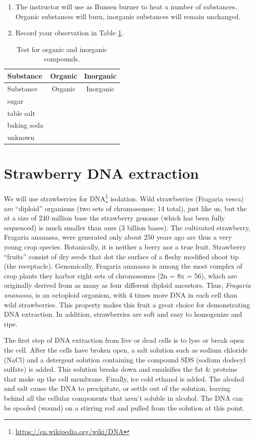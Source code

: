 \documentclass[]{book}
\providecommand{\tightlist}{%
  \setlength{\itemsep}{0pt}\setlength{\parskip}{0pt}}
\let\rmarkdownfootnote\footnote%
\def\footnote{\protect\rmarkdownfootnote}
\renewcommand{\href}[2]{#2\footnote{\url{#1}}}
\theoremstyle{definition}
\theoremstyle{definition}
\theoremstyle{definition}
\theoremstyle{remark}
\begin{document}
\begin{enumerate}
\def\labelenumi{\arabic{enumi}.}
\tightlist
\item
  The instructor will use as Bunsen burner to heat a number of
  substances. Organic substances will burn, inorganic substances will
  remain unchanged.
\item
  Record your observation in Table \ref{tab:organic}.
\end{enumerate}

\begin{longtable}[]{@{}lcc@{}}
\caption{\label{tab:organic} Test for organic and inorganic
compounds.}\tabularnewline
\toprule
Substance & Organic & Inorganic\tabularnewline
\midrule
\endfirsthead
\toprule
Substance & Organic & Inorganic\tabularnewline
\midrule
\endhead
sugar & &\tabularnewline
table salt & &\tabularnewline
baking soda & &\tabularnewline
unknown & &\tabularnewline
\bottomrule
\end{longtable}

\section{Strawberry DNA extraction}\label{strawberry-dna-extraction}

We will use strawberries for
\href{https://en.wikipedia.org/wiki/DNA}{DNA} isolation. Wild
strawberries (Fragaria vesca) are ``diploid'' organisms (two sets of
chromosomes; 14 total), just like us, but the at a size of 240 million
base the strawberry genome (which has been fully sequenced) is much
smaller than ours (3 billion bases). The cultivated strawberry, Fragaria
ananassa, were generated only about 250 years ago are thus a very young
crop species. Botanically, it is neither a berry nor a true fruit.
Strawberry ``fruits'' consist of dry seeds that dot the surface of a
fleshy modified shoot tip (the receptacle). Genomically, Fragaria
ananassa is among the most complex of crop plants they harbor eight sets
of chromosomes (2n = 8x = 56), which are originally derived from as many
as four different diploid ancestors. Thus, \emph{Fragaria ananassa}, is
an octoploid organism, with 4 times more DNA in each cell than wild
strawberries. This property makes this fruit a great choice for
demonstrating DNA extraction. In addition, strawberries are soft and
easy to homogenize and ripe.

The first step of DNA extraction from live or dead cells is to lyse or
break open the cell. After the cells have broken open, a salt solution
such as sodium chloride (NaCl) and a detergent solution containing the
compound SDS (sodium dodecyl sulfate) is added. This solution breaks
down and emulsifies the fat \& proteins that make up the cell membrane.
Finally, ice cold ethanol is added. The alcohol and salt cause the DNA
to precipitate, or settle out of the solution, leaving behind all the
cellular components that aren't soluble in alcohol. The DNA can be
spooled (wound) on a stirring rod and pulled from the solution at this
point.
\end{document}
